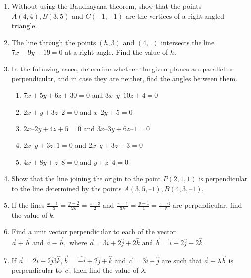 \begin{enumerate}[label=\thesubsection.\arabic*, ref=\thesubsection.\theenumi]
	\\
	
\item Without using the Baudhayana theorem,  show that the points $A(4, 4),  B(3, 5)$ and $C(-1, -1)$ are the vertices of a right angled triangle.
\label{chapters/11/10/1/6}

\item The line through the points $(h,  3)$ and $(4,  1)$ intersects the line $7x- 9y- 19= 0$ at a right angle. Find the value of $h$.
\label{chapters/11/10/3/10}
\\
\solution

\item In the following cases,  determine whether the given planes are parallel or perpendicular,  and in case they are neither,  find the angles between them.
\begin{enumerate}
\item $7x + 5y + 6z + 30 = 0$ and $3x – y – 10z + 4 = 0$
\item $2x + y + 3z – 2 = 0$ and $x – 2y + 5 = 0$
\item $2x – 2y + 4z + 5 = 0$ and $3x – 3y + 6z – 1 = 0$
\item $2x – y + 3z – 1 = 0$ and $2x – y + 3z + 3 = 0$
\item $4x + 8y + z – 8 = 0$ and $y + z – 4 = 0$
\end{enumerate}
    \solution
		
		\item 
 Show that the line joining the origin to the point $P(2,  1,  1)$ is perpendicular to the
line determined by the points $A(3,  5,  – 1),  B(4,  3,  – 1)$.
\\
    \solution
		
	\item If the lines $\frac{x-1}{-3} = \frac{y-2}{2k} = \frac{z-3}{2}$ and  $\frac{x-1}{3k} = \frac{y-1}{1} = \frac{z-6}{-5}$ are perpendicular,  find the value of $k$.\\
    \solution
		
\item Find a unit vector perpendicular to each of the vector $\overrightarrow{a}+\overrightarrow{b}\text{ and }\overrightarrow{a}-\overrightarrow{b}, \text{ where } \overrightarrow{a}=3\hat{i}+2\hat{j}+2\hat{k}\text{ and } \overrightarrow{b}=\hat{i}+2\hat{j}-2\hat{k}$. 
	\\
		\solution
		
\item If $\overrightarrow {a}=2\hat{i}+2\hat{j}3\hat{k}, \overrightarrow {b}=\hat{-i}+2\hat{j}+\hat{k}$ and $\overrightarrow {c}=3\hat{i}+\hat{j}$ are such that $\overrightarrow {a}+\lambda\overrightarrow {b}$ is perpendicular to $\overrightarrow {c}$, then find the value of $\lambda$.

\end{enumerate}
